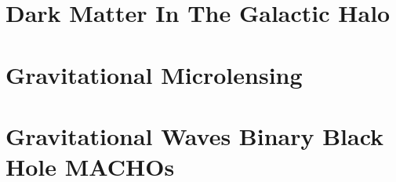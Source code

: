 
\section{Dark Matter In The Galactic Halo}

\section{Gravitational Microlensing}

\section{Gravitational Waves Binary Black Hole MACHOs}

